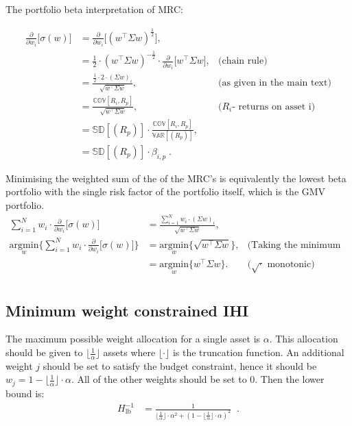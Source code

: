 \documentclass[
]{article}
\begin{document}
The portfolio beta interpretation of MRC:

\begin{align*}
\frac{\partial}{\partial w_i} \Big [ \sigma(w) \Big ] & = \frac{\partial}{\partial w_i}  \Big [ (w^\intercal \Sigma w)^{\frac{1}{2}} \Big ], & \\
& = \frac{1}{2} \cdot (w^\intercal \Sigma w)^{-\frac{1}{2}} \cdot \frac{\partial}{\partial w_i} \Big [ w^\intercal \Sigma w \Big ], &  \text{(chain rule)} \\
& = \frac{\frac{1}{2}\cdot 2 \cdot (\Sigma w)_i}{\sqrt{w^\intercal \Sigma w}}, &  \text{(as given in the main text)} \\
& = \frac{\mathbb{COV}[R_i, R_p]}{\sqrt{w^\intercal \Sigma w}}, &   \text{($R_i$- returns on asset i)} \\
& = \mathbb{SD}[(R_p)] \cdot  \frac{\mathbb{COV}[R_i, R_p]}{\mathbb{VAR}[(R_p)]}, & \\
& = \mathbb{SD}[(R_p)] \cdot \beta_{i, p}\;. &
\end{align*}

Minimising the weighted sum of the of the MRC's is equivalently the lowest beta portfolio with the
single risk factor of the portfolio itself, which is the GMV portfolio.
\begin{align*}
\sum_{i = 1}^N w_i \cdot \frac{\partial}{\partial w_i} \Big [ \sigma(w) \Big ] & = \frac{\sum_{i = 1}^N w_i \cdot (\Sigma w)_i}{\sqrt{w^\intercal \Sigma w}}, & \\
\underset{w}{\text{argmin}} \Big \{\sum_{i = 1}^N w_i \cdot \frac{\partial}{\partial w_i} \Big [ \sigma(w) \Big ]  \Big \} & = \underset{w}{\text{argmin}} \Big \{ \sqrt{w^\intercal \Sigma w} \Big\},&   \text{(Taking the minimum on   both sides)}\\
& = \underset{w}{\text{argmin}} \Big \{w^\intercal \Sigma w \} . &  \text{($\sqrt{\cdot}$ monotonic)}\\
\end{align*}

\hypertarget{ihimax}{%
\subsection{Minimum weight constrained IHI}\label{ihimax}}

The maximum possible weight allocation for a single asset is \(\alpha\). This allocation should be given
to \(\lfloor \frac{1}{\alpha} \rfloor\) assets where \(\lfloor \cdot \rfloor\) is the truncation function.
An additional weight \(j\) should be set to satisfy the budget constraint, hence it should be
\(w_j = 1 - \lfloor \frac{1}{\alpha} \rfloor \cdot \alpha\). All of the other weights should be set to
0. Then the lower bound is:
\begin{align*}
H_{\text{lb}}^{-1} & = \frac{1}{\lfloor \frac{1}{\alpha} \rfloor \cdot \alpha^2 + (1- \lfloor \frac{1}{\alpha}\rfloor \cdot \alpha)^2} \;\; .
\end{align*}
\end{document}
